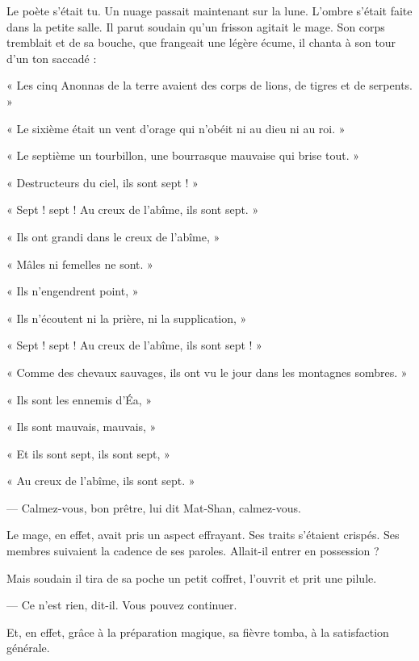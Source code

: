 \documentclass[a4paper, 11pt, oneside, polutonikogreek, french]{article}
\begin{document}
Le poète s'était tu. Un nuage passait maintenant sur la lune. L'ombre s'était faite dans la petite salle. Il parut soudain qu'un frisson agitait le mage. Son corps tremblait et de sa bouche, que frangeait une légère écume, il chanta à son tour d'un ton saccadé :

\bigskip
\centerline{\EightStarTaper}
\centerline{\EightStarTaper\EightStarTaper}
\bigskip

« Les cinq Anonnas de la terre avaient des corps de lions, de tigres et de serpents. »

« Le sixième était un vent d'orage qui n'obéit ni au dieu ni au roi. »

« Le septième un tourbillon, une bourrasque mauvaise qui brise tout. »

« Destructeurs du ciel, ils sont sept ! »

« Sept ! sept ! Au creux de l'abîme, ils sont sept. »

« Ils ont grandi dans le creux de l'abîme, »

« Mâles ni femelles ne sont. »

« Ils n'engendrent point, »

« Ils n'écoutent ni la prière, ni la supplication, »

« Sept ! sept ! Au creux de l'abîme, ils sont sept ! »

« Comme des chevaux sauvages, ils ont vu le jour dans les montagnes sombres. »

« Ils sont les ennemis d'Éa, »

« Ils sont mauvais, mauvais, »

« Et ils sont sept, ils sont sept, »

« Au creux de l'abîme, ils sont sept. »

\bigskip
\centerline{\EightStarTaper}
\centerline{\EightStarTaper\EightStarTaper}
\bigskip

--- Calmez-vous, bon prêtre, lui dit Mat-Shan, calmez-vous.

Le mage, en effet, avait pris un aspect effrayant. Ses traits s'étaient crispés. Ses membres suivaient la cadence de ses paroles. Allait-il entrer en possession ?

Mais soudain il tira de sa poche un petit coffret, l'ouvrit et prit une pilule.

--- Ce n'est rien, dit-il. Vous pouvez continuer.

Et, en effet, grâce à la préparation magique, sa fièvre tomba, à la satisfaction générale.

\bigskip
\centerline{\EightStarTaper}
\centerline{\EightStarTaper\EightStarTaper}
\bigskip
\end{document}
